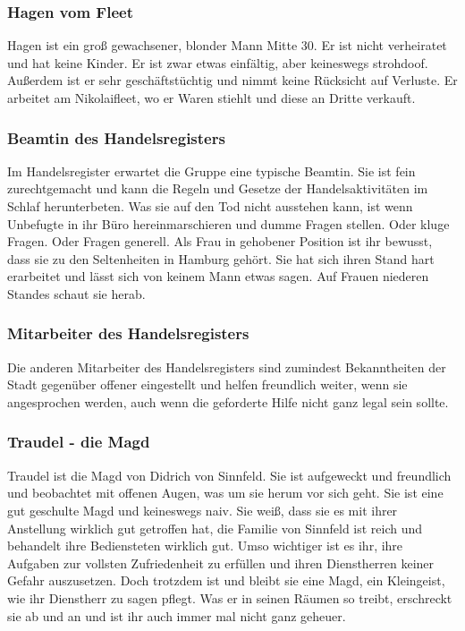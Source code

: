 \subsubsection*{Hagen vom Fleet}
\label{Hagen}

Hagen ist ein groß gewachsener, blonder Mann Mitte 30. Er ist nicht verheiratet und hat keine Kinder. Er ist zwar etwas einfältig, aber keineswegs strohdoof. Außerdem ist er sehr geschäftstüchtig und nimmt keine Rücksicht auf Verluste. Er arbeitet am Nikolaifleet, wo er Waren stiehlt und diese an Dritte verkauft.

\subsubsection*{Beamtin des Handelsregisters}
\label{Beamtin}

Im Handelsregister erwartet die Gruppe eine typische Beamtin. Sie ist fein zurechtgemacht und kann die Regeln und Gesetze der Handelsaktivitäten im Schlaf herunterbeten. Was sie auf den Tod nicht ausstehen kann, ist wenn Unbefugte in ihr Büro hereinmarschieren und dumme Fragen stellen. Oder kluge Fragen. Oder Fragen generell. Als Frau in gehobener Position ist ihr bewusst, dass sie zu den Seltenheiten in Hamburg gehört. Sie hat sich ihren Stand hart erarbeitet und lässt sich von keinem Mann etwas sagen. Auf Frauen niederen Standes schaut sie herab.

\subsubsection*{Mitarbeiter des Handelsregisters}
\label{Mitarbeiter}

Die anderen Mitarbeiter des Handelsregisters sind zumindest Bekanntheiten der Stadt gegenüber offener eingestellt und helfen freundlich weiter, wenn sie angesprochen werden, auch wenn die geforderte Hilfe nicht ganz legal sein sollte.

\subsubsection*{Traudel - die Magd}
\label{Traudel}

Traudel ist die Magd von Didrich von Sinnfeld. Sie ist aufgeweckt und freundlich und beobachtet mit offenen Augen, was um sie herum vor sich geht. Sie ist eine gut geschulte Magd und keineswegs naiv. Sie weiß, dass sie es mit ihrer Anstellung wirklich gut getroffen hat, die Familie von Sinnfeld ist reich und behandelt ihre Bediensteten wirklich gut. Umso wichtiger ist es ihr, ihre Aufgaben zur vollsten Zufriedenheit zu erfüllen und ihren Dienstherren keiner Gefahr auszusetzen. Doch trotzdem ist und bleibt sie eine Magd, ein Kleingeist, wie ihr Dienstherr zu sagen pflegt. Was er in seinen Räumen so treibt, erschreckt sie ab und an und ist ihr auch immer mal nicht ganz geheuer.

